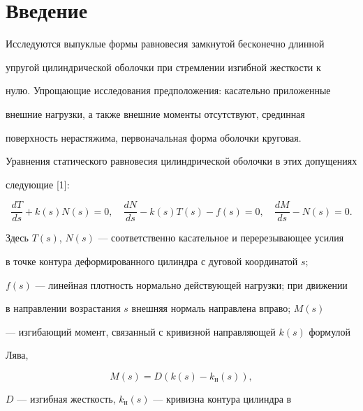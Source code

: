 \label{begin}





\section{Введение}





Исследуются выпуклые формы равновесия замкнутой бесконечно длинной


упругой цилиндрической оболочки при стремлении изгибной жесткости к


нулю. Упрощающие исследования предположения: касательно приложенные


внешние нагрузки, а также внешние моменты отсутствуют, срединная


поверхность нерастяжима, первоначальная форма оболочки круговая.





Уравнения статического равновесия цилиндрической оболочки в этих допущениях


следующие [1]:


\begin{equation}


\frac{dT}{ds}+k(s)N(s)=0,\quad \frac{dN}{ds}-k(s)T(s)-f(s)=0,


\quad \frac{dM}{ds}-N(s)=0.


\end{equation}


Здесь $T(s)$, $N(s)$ --- соответственно касательное и перерезывающее усилия


в точке контура деформированного цилиндра с дуговой координатой $s$;


$f(s)$ --- линейная плотность нормально действующей нагрузки; при движении


в направлении возрастания $s$ внешняя нормаль направлена вправо; $M(s)$


--- изгибающий момент, связанный с кривизной направляющей $k(s)$ формулой


Лява,


\begin{equation}


M(s)=D(k(s)-k_н (s)),


\end{equation}


$D$ --- изгибная жесткость, $k_н(s)$ --- кривизна контура цилиндра в


